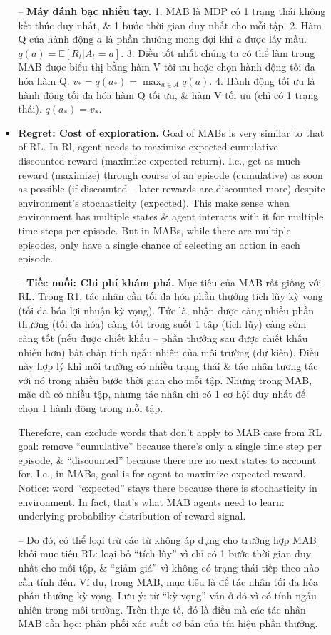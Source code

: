 \documentclass{article}
\begin{document}
\begin{itemize}
\begin{itemize}
\begin{itemize}
            -- {\bf Máy đánh bạc nhiều tay.} 1. MAB là MDP có 1 trạng thái không kết thúc duy nhất, \& 1 bước thời gian duy nhất cho mỗi tập. 2. Hàm Q của hành động $a$ là phần thưởng mong đợi khi $a$ được lấy mẫu. $q(a) = \mathbb{E}[R_t|A_t = a]$. 3. Điều tốt nhất chúng ta có thể làm trong MAB được biểu thị bằng hàm V tối ưu hoặc chọn hành động tối đa hóa hàm Q. $v_* = q(a_*) = \max_{a\in A} q(a)$. 4. Hành động tối ưu là hành động tối đa hóa hàm Q tối ưu, \& hàm V tối ưu (chỉ có 1 trạng thái). $q(a_*) = v_*$.
            \item {\bf Regret: Cost of exploration.} Goal of MABs is very similar to that of RL. In Rl, agent needs to maximize expected cumulative discounted reward (maximize expected return). I.e., get as much reward (maximize) through course of an episode (cumulative) as soon as possible (if discounted -- later rewards are discounted more) despite environment's stochasticity (expected). This make sense when environment has multiple states \& agent interacts with it for multiple time steps per episode. But in MABs, while there are multiple episodes, only have a single chance of selecting an action in each episode.

            -- {\bf Tiếc nuối: Chi phí khám phá.} Mục tiêu của MAB rất giống với RL. Trong R1, tác nhân cần tối đa hóa phần thưởng tích lũy kỳ vọng (tối đa hóa lợi nhuận kỳ vọng). Tức là, nhận được càng nhiều phần thưởng (tối đa hóa) càng tốt trong suốt 1 tập (tích lũy) càng sớm càng tốt (nếu được chiết khấu -- phần thưởng sau được chiết khấu nhiều hơn) bất chấp tính ngẫu nhiên của môi trường (dự kiến). Điều này hợp lý khi môi trường có nhiều trạng thái \& tác nhân tương tác với nó trong nhiều bước thời gian cho mỗi tập. Nhưng trong MAB, mặc dù có nhiều tập, nhưng tác nhân chỉ có 1 cơ hội duy nhất để chọn 1 hành động trong mỗi tập.

            Therefore, can exclude words that don't apply to MAB case from RL goal: remove ``cumulative'' because there's only a single time step per episode, \& ``discounted'' because there are no next states to account for. I.e., in MABs, goal is for agent to maximize expected reward. Notice: word ``expected'' stays there because there is stochasticity in environment. In fact, that's what MAB agents need to learn: underlying probability distribution of reward signal.

            -- Do đó, có thể loại trừ các từ không áp dụng cho trường hợp MAB khỏi mục tiêu RL: loại bỏ ``tích lũy'' vì chỉ có 1 bước thời gian duy nhất cho mỗi tập, \& ``giảm giá'' vì không có trạng thái tiếp theo nào cần tính đến. Ví dụ, trong MAB, mục tiêu là để tác nhân tối đa hóa phần thưởng kỳ vọng. Lưu ý: từ ``kỳ vọng'' vẫn ở đó vì có tính ngẫu nhiên trong môi trường. Trên thực tế, đó là điều mà các tác nhân MAB cần học: phân phối xác suất cơ bản của tín hiệu phần thưởng.


\end{itemize}
\end{itemize}
\end{itemize}
\end{document}

